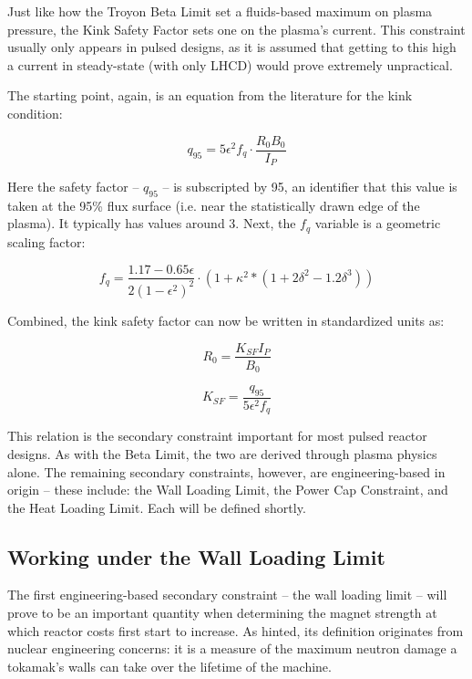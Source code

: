 Just like how the Troyon Beta Limit set a fluids-based maximum on plasma pressure, the Kink Safety Factor sets one on the plasma's current. This constraint usually only appears in pulsed designs, as it is assumed that getting to this high a current in steady-state (with only LHCD) would prove extremely unpractical.

The starting point, again, is an equation from the literature for the kink condition: \cite{ process } 

\begin{equation}
	q_{95} = 5 \epsilon^2 f_q \cdot  \frac{ R_0 B_0 }{ I_P }
\end{equation}

Here the safety factor -- $q_{95}$ -- is subscripted by 95, an identifier that this value is taken at the 95\% flux surface (i.e. near the statistically drawn edge of the plasma). It typically has values around 3. Next, the $f_q$ variable is a geometric scaling factor:

\begin{equation}
  f_q = \frac{1.17 - 0.65 \epsilon}{2 ( 1 - \epsilon^2 )^2} \cdot  \left( 1 + \kappa^2 * ( 1 + 2 \delta^2 - 1.2 \delta^3 ) \right)
\end{equation}

Combined, the kink safety factor can now be written in standardized units as:

\begin{equation}
	\label{eq:r_kink}
   R_0 = \frac{ K_{SF} I_P }{ B_0 }
\end{equation}

\begin{equation}
  K_{SF} = \frac{q_{95}}{5 \epsilon^2 f_q}
\end{equation}

This relation is the secondary constraint important for most pulsed reactor designs. As with the Beta Limit, the two are derived through plasma physics alone. The remaining secondary constraints, however, are engineering-based in origin -- these include: the Wall Loading Limit, the Power Cap Constraint, and the Heat Loading Limit. Each will be defined shortly.

\subsection{Working under the Wall Loading Limit}

The first engineering-based secondary constraint -- the wall loading limit -- will prove to be an important quantity when determining the magnet strength at which reactor costs first start to increase. As hinted, its definition originates from nuclear engineering concerns: it is a measure of the maximum neutron damage a tokamak's walls can take over the lifetime of the machine.


